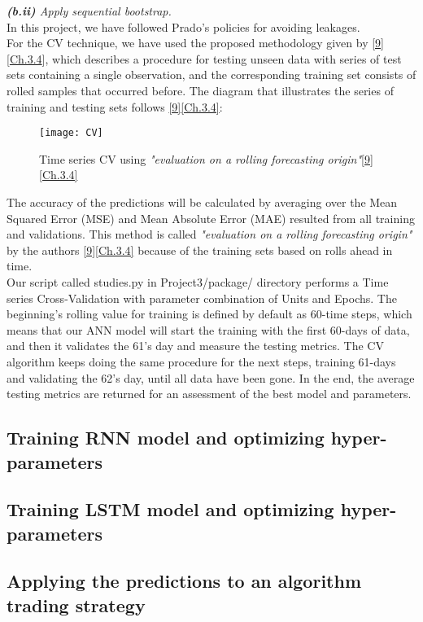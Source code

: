 \qquad \qquad \textit{\textbf{(b.ii)} Apply sequential bootstrap.}\\

In this project, we have followed Prado's policies for avoiding leakages.\\

For the CV technique, we have used the proposed methodology given by \hyperref[Bib:Hyndman, R.J., and Athanasopoulos, G.]{[9]}[\href{https://otexts.com/fpp2/}{Ch.3.4}], which describes a procedure for testing unseen data with series of test sets containing a single observation, and the corresponding training set consists of rolled samples that occurred before. The diagram that illustrates the series of training and testing sets follows \hyperref[Bib:Hyndman, R.J., and Athanasopoulos, G.]{[9][Ch.3.4]}:

\begin{figure}[H]
\label{fig:CV}
\centering
\texttt{[image: CV]}
\caption{Time series CV using \textit{"evaluation on a rolling forecasting origin"}\hyperref[Bib:Hyndman, R.J., and Athanasopoulos, G.]{[9][Ch.3.4]}}
\end{figure}

The accuracy of the predictions will be calculated by averaging over the Mean Squared Error (MSE) and Mean Absolute Error (MAE) resulted from all training and validations. This method is called \textit{"evaluation on a rolling forecasting origin"} by the authors \hyperref[Bib:Hyndman, R.J., and Athanasopoulos, G.]{[9][Ch.3.4]} because of the training sets based on rolls ahead in time.\\

Our script called studies.py in Project3/package/ directory performs a Time series Cross-Validation with parameter combination of Units and Epochs. The beginning's rolling value for training is defined by default as 60-time steps, which means that our ANN model will start the training with the first 60-days of data, and then it validates the 61's day and measure the testing metrics. The CV algorithm keeps doing the same procedure for the next steps, training 61-days and validating the 62's day, until all data have been gone. In the end, the average testing metrics are returned for an assessment of the best model and parameters.

\subsection{Training RNN model and optimizing hyper-parameters}
\label{chap:Training RNN model and optimizing hyper-parameters}




\subsection{Training LSTM model and optimizing hyper-parameters}
\label{chap:Training LSTM model and optimizing hyper-parameters}

\subsection{Applying the predictions to an algorithm trading strategy}
\label{chap:Applying the predictions to an algorithm trading strategy}
